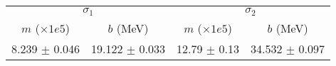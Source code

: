 \begin{tabular}{cc|cc}
\multicolumn{2}{c|}{$\sigma_1$} & \multicolumn{2}{|c}{$\sigma_2$} \\
$m$ ($\times1e5$) & $b$ (MeV) & $m$ ($\times1e5$) & $b$ (MeV) \\
\hline
8.239 $\pm$ 0.046 & 19.122 $\pm$ 0.033 & 12.79 $\pm$ 0.13 & 34.532 $\pm$ 0.097\\
\end{tabular}
